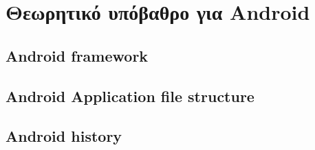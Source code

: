 \chapter{Θεωρητικό υπόβαθρο για Android}\label{ch:Theory Background Android}
\section{Android framework}
\section{Android Application file structure}
\section{Android history}

